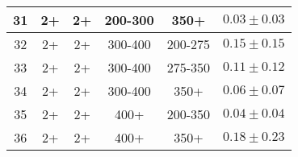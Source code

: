 \begin{table}[htbp]
\begin{tabular}{|c|c|c|c|c||c|}
 \hline
             31 &              2+ &              2+ &         200-300 &            350+ & $0.03 \pm 0.03$ \\
 \hline
             32 &              2+ &              2+ &         300-400 &         200-275 & $0.15 \pm 0.15$ \\
 \hline
             33 &              2+ &              2+ &         300-400 &         275-350 & $0.11 \pm 0.12$ \\
 \hline
             34 &              2+ &              2+ &         300-400 &            350+ & $0.06 \pm 0.07$ \\
 \hline
             35 &              2+ &              2+ &            400+ &         200-350 & $0.04 \pm 0.04$ \\
 \hline
             36 &              2+ &              2+ &            400+ &            350+ & $0.18 \pm 0.23$ \\
 \hline
\end{tabular}
\end{table}
 
